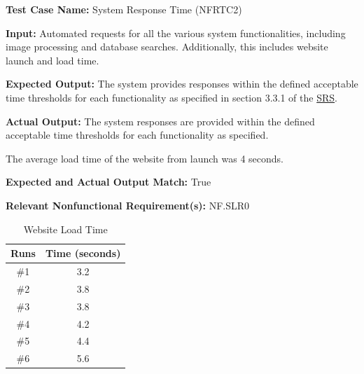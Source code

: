 \documentclass[12pt, titlepage]{article}
\begin{document}
\begin{mdframed}[linewidth=0.5mm]
  \textbf{Test Case Name:} System Response Time (NFRTC2) \par
  \textbf{Input:} Automated requests for all the various system functionalities, including image processing and database searches. Additionally, this includes website launch and load time. \par
  \textbf{Expected Output:} The system provides responses within the defined acceptable time thresholds for each functionality as specified in section 3.3.1 of the \href{https://github.com/tusharagg1/chest-x-ray-ai/blob/main/docs/SRS/SRS.pdf}{SRS}. \par
  \textbf{Actual Output:} The system responses are provided within the defined acceptable time thresholds for each functionality as specified.
  
  The average load time of the website from launch was 4 seconds. 
  \par
  \textbf{Expected and Actual Output Match:} True \par
  \textbf{Relevant Nonfunctional Requirement(s):} NF.SLR0

  \begin{table}[H]
  \centering
    \label{tab:websiteLoadTime}
    \begin{tabular}{|c|c|}
    \hline
       Runs  & Time (seconds) \\
       \hline
        \#1 & 3.2  \\
        \#2 & 3.8  \\
        \#3 & 3.8  \\
        \#4 & 4.2  \\
        \#5 & 4.4  \\
        \#6 & 5.6 \\
        \hline
    \end{tabular}
    \caption{Website Load Time}
  \end{table}


\end{mdframed}
\end{document}
